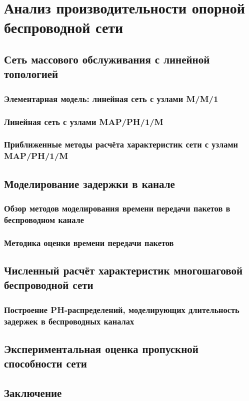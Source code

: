 \chapter{Анализ производительности опорной беспроводной сети}\label{ch:ch4}


\section{Сеть массового обслуживания с линейной топологией}\label{sec:ch4_queueing_network}

\subsection{Элементарная модель: линейная сеть с узлами M/M/1}\label{sec:ch4_mm1_network}

\subsection{Линейная сеть с узлами MAP/PH/1/M}

\subsection{Приближенные методы расчёта характеристик сети с узлами MAP/PH/1/M}



\section{Моделирование задержки в канале}\label{sec:ch4_service_time}

\subsection{Обзор методов моделирования времени передачи пакетов в беспроводном канале}

\subsection{Методика оценки времени передачи пакетов}



\section{Численный расчёт характеристик многошаговой беспроводной сети}\label{sec:ch4_numeric_results}

\subsection{Построение PH-распределений, моделирующих длительность задержек в беспроводных каналах}



\section{Экспериментальная оценка пропускной способности сети}\label{sec:ch4_stand_results}



\section{Заключение}\label{sec:ch4_conclusion}



\clearpage
